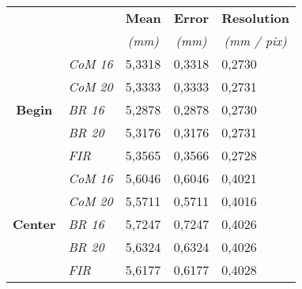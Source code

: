 \begin{table}[t!]
  \centering
  \begin{tabular}{|cl|p{2.3cm}|p{2.3cm}|p{2.3cm}|}
  \hline
  \multicolumn{2}{|c|}{\multirow{2}{*}{}}              & \multicolumn{1}{c|}{\textbf{Mean}} & \multicolumn{1}{c|}{\textbf{Error}} & \multicolumn{1}{c|}{\textbf{Resolution}} \\
  \multicolumn{2}{|c|}{}                               & \multicolumn{1}{c|}{\textit{(mm)}} & \multicolumn{1}{c|}{\textit{(mm)}}  & \multicolumn{1}{c|}{\textit{(mm / pix)}} \\
  \hline
  \multirow{5}{*}{\textbf{Begin}}  & \textit{CoM 16} & 5,3318                            & 0,3318                             & 0,2730                                  \\
                                 & \textit{CoM 20} & 5,3333                            & 0,3333                             & 0,2731                                  \\
                                 & \textit{BR 16}  & 5,2878                            & 0,2878                             & 0,2730                                  \\
                                 & \textit{BR 20}  & 5,3176                            & 0,3176                             & 0,2731                                  \\
                                 & \textit{FIR}    & 5,3565                            & 0,3566                             & 0,2728                                  \\
  \hline
\multirow{5}{*}{\textbf{Center}} & \textit{CoM 16} & 5,6046                            & 0,6046                             & 0,4021                                  \\
                                 & \textit{CoM 20} & 5,5711                            & 0,5711                             & 0,4016                                  \\
                                 & \textit{BR 16}  & 5,7247                            & 0,7247                             & 0,4026                                  \\
                                 & \textit{BR 20}  & 5,6324                            & 0,6324                             & 0,4026                                  \\
                                 & \textit{FIR}    & 5,6177                            & 0,6177                             & 0,4028                                  \\

\end{tabular}
\end{table}
